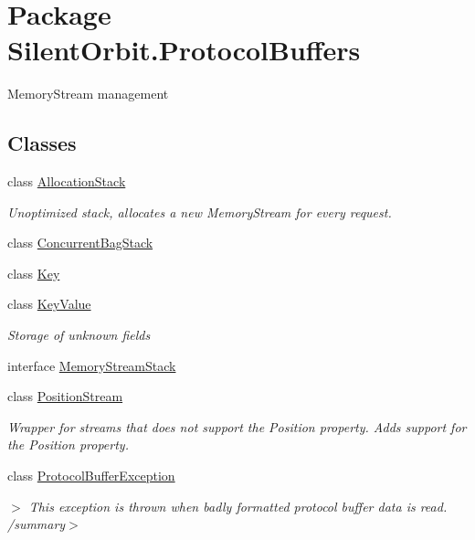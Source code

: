 \hypertarget{namespace_silent_orbit_1_1_protocol_buffers}{}\section{Package Silent\+Orbit.\+Protocol\+Buffers}
\label{namespace_silent_orbit_1_1_protocol_buffers}


Memory\+Stream management  


\subsection*{Classes}
\begin{DoxyCompactItemize}
\item 
class \hyperlink{class_silent_orbit_1_1_protocol_buffers_1_1_allocation_stack}{Allocation\+Stack}
\begin{DoxyCompactList}\small\item\em Unoptimized stack, allocates a new Memory\+Stream for every request. \end{DoxyCompactList}\item 
class \hyperlink{class_silent_orbit_1_1_protocol_buffers_1_1_concurrent_bag_stack}{Concurrent\+Bag\+Stack}
\item 
class \hyperlink{class_silent_orbit_1_1_protocol_buffers_1_1_key}{Key}
\item 
class \hyperlink{class_silent_orbit_1_1_protocol_buffers_1_1_key_value}{Key\+Value}
\begin{DoxyCompactList}\small\item\em Storage of unknown fields \end{DoxyCompactList}\item 
interface \hyperlink{interface_silent_orbit_1_1_protocol_buffers_1_1_memory_stream_stack}{Memory\+Stream\+Stack}
\item 
class \hyperlink{class_silent_orbit_1_1_protocol_buffers_1_1_position_stream}{Position\+Stream}
\begin{DoxyCompactList}\small\item\em Wrapper for streams that does not support the Position property. Adds support for the Position property. \end{DoxyCompactList}\item 
class \hyperlink{class_silent_orbit_1_1_protocol_buffers_1_1_protocol_buffer_exception}{Protocol\+Buffer\+Exception}
\begin{DoxyCompactList}\small\item\em $>$ This exception is thrown when badly formatted protocol buffer data is read. /summary$>$ \end{DoxyCompactList}\item 

\end{DoxyCompactItemize}

